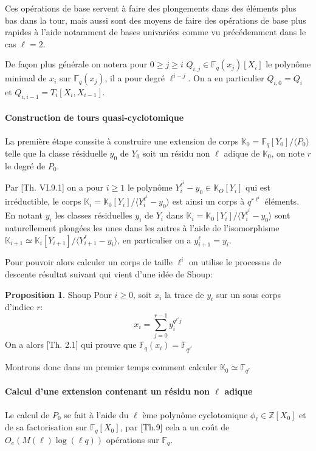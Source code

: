 \documentclass[10pt,a4paper]{book}
\theoremstyle{plain}
\theoremstyle{definition}
\theoremstyle{definition}
\theoremstyle{definition}
\newtheorem{prop}[thm]{Proposition}
\theoremstyle{definition}
\theoremstyle{remark}
\theoremstyle{remark}
\begin{document}
Ces opérations de base servent à faire des plongements dans des éléments plus bas dans la tour, mais aussi sont des moyens de faire des opérations de base plus rapides à l'aide notamment de bases univariées comme vu précédemment dans le cas $\ell=2$.

De façon plus générale on notera pour $0 \geqslant j \geqslant i $ $Q_{i,j} \in \mathbb{F}_q(x_j)[X_i]$ le polynôme minimal de $x_i$ sur $\mathbb{F}_{q}(x_j)$, il a pour degré $\ell^{i-j}$. On a en particulier $Q_{i,0}=Q_i$ et $Q_{i,i-1}=T_{i}[X_i,X_{i-1}]$.

\paragraph{Construction de tours quasi-cyclotomique}
La première étape conssite à construire une extension de corps $\mathbb{K}_0=\mathbb{F}_q[Y_0]/\langle P_0 \rangle$ telle que la classe résiduelle $y_0$ de $Y_0$ soit un résidu non $\ell$ adique de $\mathbb{K}_0$, on note $r$ le degré de $P_0$.

Par \cite{Lang2002algebra}[Th. VI.9.1] on a pour $i \geqslant 1$ le polynôme $Y_i^{\ell^i}-y_0 \in \mathbb{K}_O[Y_i]$ qui est irréductible, le corps $\mathbb{K}_i=\mathbb{K}_0[Y_i]/\langle Y_i^{\ell^i}-y_0 \rangle$ est ainsi un corps à $q^{r\ell^i}$ éléments. En notant $y_i$ les classes résiduelles $y_i$ de $Y_i$ dans $\mathbb{K}_i=\mathbb{K}_0[Y_i]/\langle Y_i^{\ell^i}-y_0 \rangle$ sont naturellement plongées les unes dans les autres à l'aide de l'isomorphisme $\mathbb{K}_{i+1} \simeq \mathbb{K}_i[Y_{i+1}]/\langle Y_{i+1}^{\ell}-y_i\rangle $, en particulier on a $y_{i+1}^{\ell}=y_i$.


 Pour pouvoir alors calculer un corps de taille $\ell^i$ on utilise le processus de descente résultat suivant qui vient d'une idée de Shoup:

\begin{prop}{Shoup}
Pour $i \geqslant 0$, soit $x_i$ la trace de $y_i$ sur un sous corps d'indice $r$:
\begin{equation*}
x_i=\sum_{j=0}^{r-1}y_i^{q^{\ell^i}j}
\end{equation*}
On a alors \cite{Shoup88}[Th. 2.1] qui prouve que $\mathbb{F}_q(x_i)=\mathbb{F}_{q^{\ell^i}}$
\end{prop}

Montrons donc dans un premier temps comment calculer $\mathbb{K}_0 \simeq \mathbb{F}_{q^r}$



\paragraph{Calcul d'une extension contenant un résidu non $\ell$ adique}
Le calcul de $P_0$ se fait à l'aide du $\ell$ ème polynôme cyclotomique $\phi_{\ell} \in \mathbb{Z}[X_0]$ et de sa factorisation sur $\mathbb{F}_q[X_0]$, par \cite{Shoup93}[Th.9] cela a un coût de $O_e(M(\ell)\log(\ell q))$ opérations sur $\mathbb{F}_q$.
\end{document}
